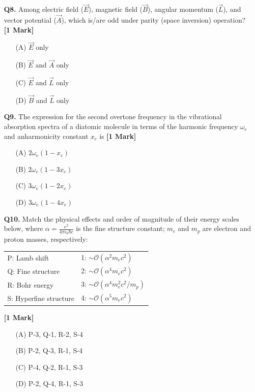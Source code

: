 \documentclass[11pt]{article}
\newcommand{\questiona}[2]{
    \noindent\textbf{Q#2.} #1 \hfill \textbf{[1 Mark]}
}
\begin{document}
\questiona{Among electric field (\(\vec{E}\)), magnetic field (\(\vec{B}\)), angular momentum (\(\vec{L}\)), and vector potential (\(\vec{A}\)), which is/are odd under parity (space inversion) operation?}{8}
\begin{enumerate}
    \item[(A)] \(\vec{E}\) only  
    \item[(B)] \(\vec{E}\) and \(\vec{A}\) only  
    \item[(C)] \(\vec{E}\) and \(\vec{L}\) only  
    \item[(D)] \(\vec{B}\) and \(\vec{L}\) only  
\end{enumerate}
\vspace{0.5cm}

\questiona{The expression for the second overtone frequency in the vibrational absorption spectra of a diatomic molecule in terms of the harmonic frequency \(\omega_e\) and anharmonicity constant \(x_e\) is}{9}
\begin{enumerate}
    \item[(A)] \(2\omega_e(1 - x_e)\)  
    \item[(B)] \(2\omega_e(1 - 3x_e)\)  
    \item[(C)] \(3\omega_e(1 - 2x_e)\)  
    \item[(D)] \(3\omega_e(1 - 4x_e)\)  
\end{enumerate}
\vspace{0.5cm}

\questiona{Match the physical effects and order of magnitude of their energy scales below, where \(\alpha = \frac{e^2}{4\pi\epsilon_0\hbar c}\) is the fine structure constant; \(m_e\) and \(m_p\) are electron and proton masses, respectively:

\begin{tabular}{ll}
P: Lamb shift & 1: \(\sim \mathcal{O}(\alpha^2 m_e c^2)\) \\
Q: Fine structure & 2: \(\sim \mathcal{O}(\alpha^4 m_e c^2)\) \\
R: Bohr energy & 3: \(\sim \mathcal{O}(\alpha^4 m_e^2 c^2 / m_p)\) \\
S: Hyperfine structure & 4: \(\sim \mathcal{O}(\alpha^5 m_e c^2)\) \\
\end{tabular}}{10}
\begin{enumerate}
    \item[(A)] P-3, Q-1, R-2, S-4  
    \item[(B)] P-2, Q-3, R-1, S-4  
    \item[(C)] P-4, Q-2, R-1, S-3  
    \item[(D)] P-2, Q-4, R-1, S-3  
\end{enumerate}
\vspace{0.5cm}
\end{document}
